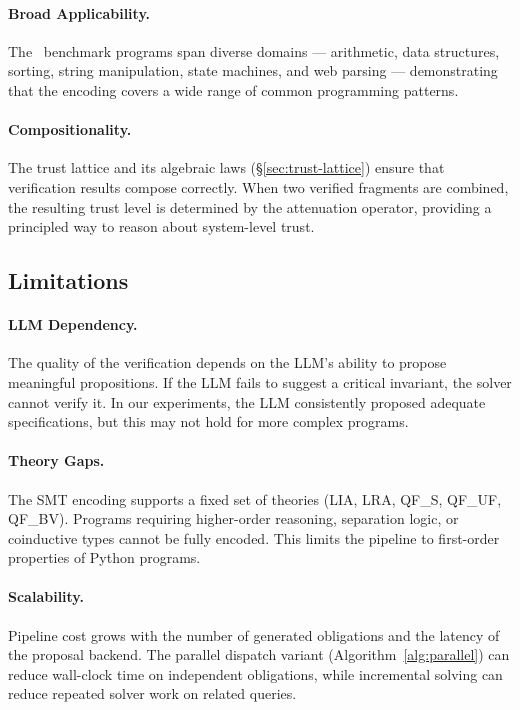 \documentclass[11pt]{article}
\begin{document}
\paragraph{Broad Applicability.}
The \ppLItotalPrograms\ benchmark programs span diverse domains ---
arithmetic, data structures, sorting, string manipulation, state
machines, and web parsing --- demonstrating that the encoding covers
a wide range of common programming patterns.

\paragraph{Compositionality.}
The trust lattice and its algebraic laws (§\ref{sec:trust-lattice})
ensure that verification results compose correctly.  When two verified
fragments are combined, the resulting trust level is determined by the
attenuation operator, providing a principled way to reason about
system-level trust.

\subsection{Limitations}

\paragraph{LLM Dependency.}
The quality of the verification depends on the LLM's ability to
propose meaningful propositions.  If the LLM fails to suggest a
critical invariant, the solver cannot verify it.  In our experiments,
the LLM consistently proposed adequate specifications, but this may
not hold for more complex programs.

\paragraph{Theory Gaps.}
The SMT encoding supports a fixed set of theories (LIA, LRA, QF\_S,
QF\_UF, QF\_BV).  Programs requiring higher-order reasoning,
separation logic, or coinductive types cannot be fully encoded.
This limits the pipeline to first-order properties of Python programs.

\paragraph{Scalability.}
Pipeline cost grows with the number of generated obligations and the
latency of the proposal backend.  The parallel dispatch variant
(Algorithm~\ref{alg:parallel}) can reduce wall-clock time on independent
obligations, while incremental solving can reduce repeated solver work on
related queries.
\end{document}
